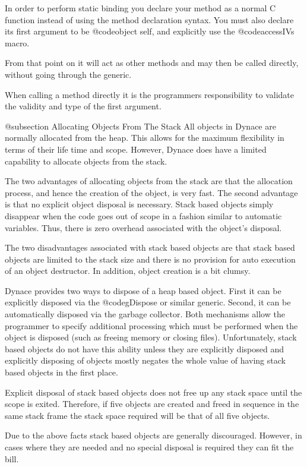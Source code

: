 In order to perform static binding you declare your method as a normal
C function instead of using the method declaration syntax.  You must
also declare its first argument to be @code{object self}, and explicitly use
the @code{accessIVs} macro.

From that point on it will act as other methods and may then be called
directly, without going through the generic.


When calling a method directly it is the programmers responsibility to
validate the validity and type of the first argument.


@subsection Allocating Objects From The Stack
All objects in Dynace are normally allocated from the heap.  This
allows for the maximum flexibility in terms of their life time
and scope.  However, Dynace does have a limited capability to
allocate objects from the stack.

The two advantages of allocating objects from the stack are that
the allocation process, and hence the creation of the object, is very
fast.  The second advantage is that no explicit object disposal is
necessary. Stack based objects simply disappear when the code goes
out of scope in a fashion similar to automatic variables.  Thus,
there is zero overhead associated with the object's disposal.

The two disadvantages associated with stack based objects are that stack
based objects are limited to the stack size and there is no provision
for auto execution of an object destructor.  In addition, object
creation is a bit clumsy.

Dynace provides two ways to dispose of a heap based object.  First it
can be explicitly disposed via the @code{gDispose} or similar generic.
Second, it can be automatically disposed via the garbage collector.
Both mechanisms allow the programmer to specify additional processing
which must be performed when the object is disposed (such as freeing
memory or closing files).  Unfortunately, stack based objects do not have
this ability unless they are explicitly disposed and explicitly disposing
of objects mostly negates the whole value of having stack based objects
in the first place.

Explicit disposal of stack based objects does not free up any stack
space until the scope is exited.  Therefore, if five objects are created
and freed in sequence in the same stack frame the stack space required
will be that of all five objects.

Due to the above facts stack based objects are generally discouraged.
However, in cases where they are needed and no special disposal
is required they can fit the bill.

